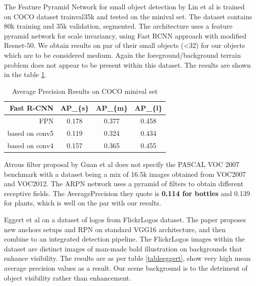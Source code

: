 \documentclass{IEEEtran}
\begin{document}
The Feature Pyramid Network for small object detection by Lin et al \cite{Lin2017a} is trained on COCO dataset trainval35k and tested on the minival set. The dataset contains 80k training and 35k validation, segmented. The architecture uses a feature pyramid network for scale invariancy, using Fast RCNN approach with modified Resnet-50. We obtain results on par of their small objects (<32) for our objects which are to be considered medium. Again the foreground/background terrain problem does not appear to be present within this dataset. The results are shown in the table \ref{fpnresults}.

\begin{table}[]
\centering
\caption{Average Precision Results on COCO minival set}
\label{fpnresults}
\begin{tabular}{rccc}
\hline
\textbf{Fast R-CNN} & \textbf{AP\_\{s\}} & \multicolumn{1}{c|}{\textbf{AP\_\{m\}}} & \multicolumn{1}{c|}{\textbf{AP\_\{l\}}} \\ \hline
FPN                 & 0.178              & 0.377                                   & 0.458                                   \\
based on conv5      & 0.119              & 0.324                                   & 0.434                                   \\
based on conv4      & 0.157              & 0.365                                   & 0.455                                  
\end{tabular}
\end{table}

Atrous filter proposal by Guan et al \cite{Guan2017} does not specify the PASCAL VOC 2007 benchmark with a dataset being a mix of 16.5k images obtained from VOC2007 and VOC2012. The ARPN network uses a pyramid of filters to obtain different receptive fields. The AveragePrecision they quote is \textbf{0.114 for bottles} and 0.139 for plants, which is well on the par with our results.\newline

Eggert et al \cite{ChristianEggertStephanBrehmAntonWinschelDanZecha2017} on a dataset of logos from FlickrLogos dataset.  The paper proposes new anchors setups and RPN on standard VGG16 architecture, and then combine to an integrated detection pipeline. The FlickrLogos images within the dataset are distinct images of man-made bold illustration on backgrounds that enhance visibility. The results are as per table \ref{tableeggert}, show very high mean average precision values as a result. Our scene background is to the detriment of object visibility rather than enhancement.
\end{document}
